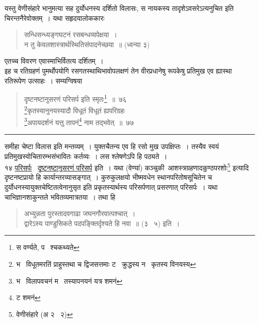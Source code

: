 \documentclass[11pt, openany]{book}
\begin{document}
\noindent
यस्तु वेणीसंहारे भानुमत्या सह दुर्योधनस्य दर्शितो विलासः, स नायकस्य तादृशेऽवसरेऽत्यनुचित इति चिरन्तनैरेवोक्तम्~। यथा सहृदयालोककारः\textendash

\begin{quote}
{\qt सन्धिसन्ध्यङ्गघटनं रसबन्धव्यपेक्षया~।\\
न तु केवलशास्त्रार्थस्थितिसंपादनेच्छया~॥} (ध्वन्या ३)
\end{quote}

\noindent
एतच्च विवरण एवास्माभिर्वितत्य दर्शितम्~।\\

इह च रतिग्रहणं पुमर्थोपयोगि रसगतस्थाथिभावोपलक्षणं तेन वीरप्रधानेषु रूपकेषु प्रतिमुख एव ह्यास्था रतिरूपेण उत्साहः~। सम्यग्विषया

\newpage

\begin{quote}
{\na दृष्टनष्टानुसरणं परिसर्प इति स्मृतः\renewcommand{\thefootnote}{1}\footnote{स वर्ण्यते, प \textendash\ श्चकथ्यते}~॥~७६\\

\renewcommand{\thefootnote}{2}\footnote{भ \textendash\ विधूतमरतिं प्राहुस्तथा च द्विजसत्तमाः ट \textendash\ क्रुद्धस्य न \textendash\ कृतस्य विनयस्य}कृतस्यानुनयस्यादौ विधूतं विधूतं ह्यपरिग्रहः \\
\renewcommand{\thefootnote}{3}\footnote{भ \textendash\ विलापवचनं म \textendash\ तस्यापनयनं यत्र शमनं}अपायदर्शनं यत्तु तापनं\renewcommand{\thefootnote}{4}\footnote{ट शमनं} नाम तद्भवेत्~॥~७७}
\end{quote}

\hrule

\vspace{2mm}
\noindent
समीहा चेष्टा विलास इति मन्तव्यम्~। युक्तचैतन्य एव हि रसो मुख उपक्षिप्तः~। तस्यैव स्वयं प्रतिमुखस्वोचितारम्भसंभावितः कर्तव्यः~। लस श्लेषणेऽपि हि पठ्यते~।\\

१४ \underline{परिसर्पः} \textendash\ \underline{दृष्टनष्टानुसरणं परिसर्प} इति~। यथा (वेण्यां) कञ्चुकी\textendash\ {\qt आशस्त्रग्रहणादकुण्ठपरशोः}\renewcommand{\thefootnote}{*}\footnote{वेणीसंहारे (अ २ \textendash\ २)} इत्यादि दृष्टनष्टप्रायो हि कार्यान्तरव्यासङ्गात्~। कुरुकुलक्षयो भीष्मवधेन स्थानपरितोषसूचितेन च दुर्योधनस्यायुक्तचेष्टितत्वेनानुसृत इति प्रकृतस्यार्थस्य परिसर्पणात् प्रसरणात् परिसर्पः~। यथा चाभिज्ञानशाकुन्तले भवितव्यमात्रतया~। तथा हि \textendash

\begin{quote}
{\qt अभ्युन्नता पुरस्तादवगाढा जघनगौरवात्पश्चात्~।\\
द्वारेऽस्य पाण्डुसिकते पदपङ्क्तिर्दृश्यते हि नवा~॥} (३ \textendash\ ५) इति~।
\end{quote}
\end{document}
